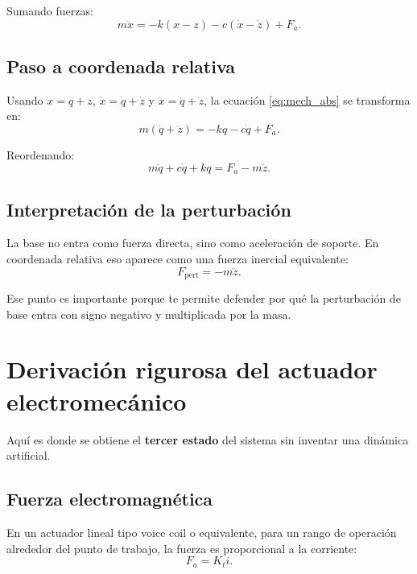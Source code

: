 \documentclass[11pt]{article}
\begin{document}
Sumando fuerzas:
\begin{equation}
m\ddot x = -k(x-z)-c(\dot x-\dot z)+F_a.
\label{eq:mech_abs}
\end{equation}

\subsection{Paso a coordenada relativa}

Usando $x=q+z$, $\dot x=\dot q+\dot z$ y $\ddot x=\ddot q+\ddot z$, la ecuaci\'on \eqref{eq:mech_abs} se transforma en:
\begin{equation}
m(\ddot q+\ddot z) = -kq-c\dot q+F_a.
\end{equation}

Reordenando:
\begin{equation}
m\ddot q + c\dot q + kq = F_a - m\ddot z.
\label{eq:mech_rel}
\end{equation}

\subsection{Interpretaci\'on de la perturbaci\'on}

La base no entra como fuerza directa, sino como aceleraci\'on de soporte. En coordenada relativa eso aparece como una fuerza inercial equivalente:
\begin{equation}
F_{\text{pert}} = -m\ddot z.
\end{equation}

Ese punto es importante porque te permite defender por qu\'e la perturbaci\'on de base entra con signo negativo y multiplicada por la masa.

\section{Derivaci\'on rigurosa del actuador electromec\'anico}

Aqu\'i es donde se obtiene el \textbf{tercer estado} del sistema sin inventar una din\'amica artificial.

\subsection{Fuerza electromagn\'etica}

En un actuador lineal tipo voice coil o equivalente, para un rango de operaci\'on alrededor del punto de trabajo, la fuerza es proporcional a la corriente:
\begin{equation}
F_a = K_t i.
\label{eq:Kt}
\end{equation}
\end{document}
